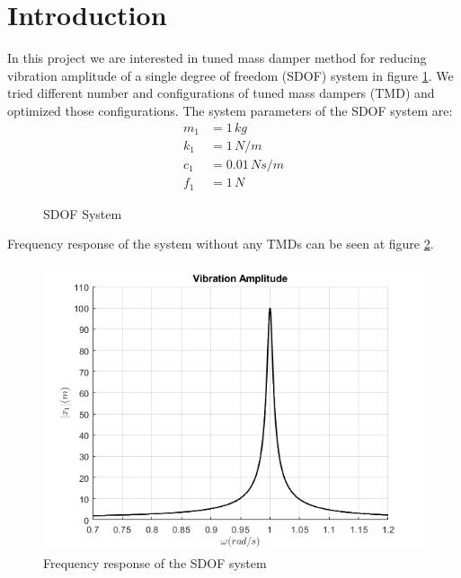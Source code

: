 \section{Introduction}
\par In this project we are interested in tuned mass damper method for reducing vibration amplitude of a single degree of freedom (SDOF) system in figure \ref{fig:SDOF}. We tried different number and configurations of tuned mass dampers (TMD) and optimized those configurations. The system parameters of the SDOF system are:
\begin{align*}
    m_1 & = 1\,kg\\
    k_1 & = 1\,N/m\\
    c_1 & = 0.01\,Ns/m\\
    f_1 & = 1\,N
\end{align*}
\begin{figure}[ht]
    \centering
    
    \caption{SDOF System}
    \label{fig:SDOF}
\end{figure}
Frequency response of the system without any TMDs can be seen at figure \ref{fig:freq_SDOF}.

\begin{figure}[ht]
    \centering
    \includegraphics[scale=0.6]{MATLAB Figures/SDOF.png}
    \caption{Frequency response of the SDOF system}
    \label{fig:freq_SDOF}
\end{figure}